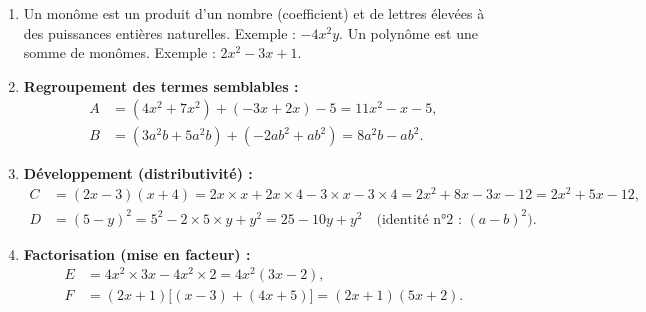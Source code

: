 \documentclass[11pt]{article}
\newcommand{\cle}[1]{{\popxbold\color{popdark}#1}}
\begin{document}
\begin{corrige}
\begin{enumerate}
    \item Un \cle{monôme} est un produit d'un nombre (coefficient) et de lettres élevées à des puissances entières naturelles. Exemple : $-4x^2y$. Un \cle{polynôme} est une somme de monômes. Exemple : $2x^2 - 3x + 1$.
    \item \textbf{Regroupement des termes semblables :}
    \begin{align*}
    A &= (4x^2 + 7x^2) + (-3x + 2x) - 5 = 11x^2 - x - 5,\\
    B &= (3a^2b + 5a^2b) + (-2ab^2 + ab^2) = 8a^2b - ab^2.
    \end{align*}
    \item \textbf{Développement (distributivité) :}
    \begin{align*}
    C &= (2x-3)(x+4) = 2x\times x + 2x\times 4 - 3\times x - 3\times 4 = 2x^2 + 8x - 3x - 12 = 2x^2 + 5x - 12,\\
    D &= (5-y)^2 = 5^2 - 2\times 5\times y + y^2 = 25 - 10y + y^2 \quad \text{(identité n°2 : $(a-b)^2$)}.
    \end{align*}
    \item \textbf{Factorisation (mise en facteur) :}
    \begin{align*}
    E &= 4x^2 \times 3x - 4x^2 \times 2 = 4x^2(3x - 2),\\
    F &= (2x+1)\big[(x-3) + (4x+5)\big] = (2x+1)(5x+2).
    \end{align*}
\end{enumerate}
\end{corrige}
\end{document}

